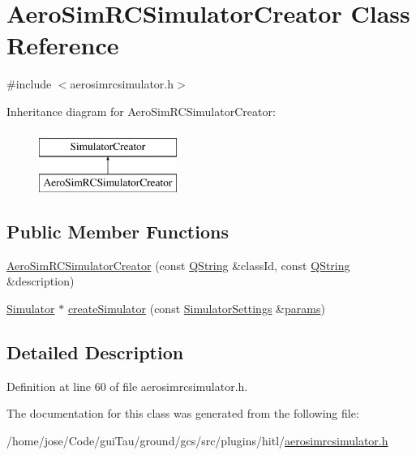 \hypertarget{class_aero_sim_r_c_simulator_creator}{\section{Aero\-Sim\-R\-C\-Simulator\-Creator Class Reference}
\label{class_aero_sim_r_c_simulator_creator}
}


{\ttfamily \#include $<$aerosimrcsimulator.\-h$>$}

Inheritance diagram for Aero\-Sim\-R\-C\-Simulator\-Creator\-:\begin{figure}[H]
\begin{center}
\leavevmode
\includegraphics[height=2.000000cm]{class_aero_sim_r_c_simulator_creator}
\end{center}
\end{figure}
\subsection*{Public Member Functions}
\begin{DoxyCompactItemize}
\item 
\hyperlink{group___h_i_t_l_plugin_ga7e85a0e376c9dcd7dae84a4f2cf14d10}{Aero\-Sim\-R\-C\-Simulator\-Creator} (const \hyperlink{group___u_a_v_objects_plugin_gab9d252f49c333c94a72f97ce3105a32d}{Q\-String} \&class\-Id, const \hyperlink{group___u_a_v_objects_plugin_gab9d252f49c333c94a72f97ce3105a32d}{Q\-String} \&description)
\item 
\hyperlink{class_simulator}{Simulator} $\ast$ \hyperlink{group___h_i_t_l_plugin_ga25c808a48fec179504d84ef28fe8e762}{create\-Simulator} (const \hyperlink{group___h_i_t_l_plugin_ga052199f1328d3002bce3e45345aa7f4e}{Simulator\-Settings} \&\hyperlink{glext_8h_afeb6390ab3bc8a0e96a88aff34d52288}{params})
\end{DoxyCompactItemize}


\subsection{Detailed Description}


Definition at line 60 of file aerosimrcsimulator.\-h.



The documentation for this class was generated from the following file\-:\begin{DoxyCompactItemize}
\item 
/home/jose/\-Code/gui\-Tau/ground/gcs/src/plugins/hitl/\hyperlink{aerosimrcsimulator_8h}{aerosimrcsimulator.\-h}\end{DoxyCompactItemize}
